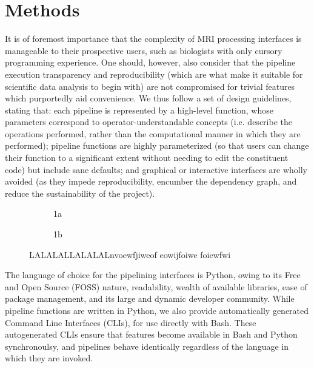 \section{Methods}
It is of foremost importance that the complexity of MRI processing interfaces is manageable to their prospective users, such as biologists with only cursory programming experience.
One should, however, also consider that the pipeline execution transparency and reproducibility (which are what make it suitable for scientific data analysis to begin with) are not compromised for trivial features which purportedly aid convenience. 
We thus follow  a set of design guidelines, stating that:
each pipeline is represented by a high-level function, whose parameters correspond to operator-understandable concepts (i.e. describe the operations performed, rather than the computational manner in which they are performed); 
pipeline functions are highly parameterized (so that users can change their function to a significant extent without needing to edit the constituent code) but include sane defaults;
and graphical or interactive interfaces are wholly avoided (as they impede reproducibility, encumber the dependency graph, and reduce the sustainability of the project).

\begin{figure*}[h]
	\begin{subfigure}{.67\textwidth}
		\centering
		\vspace{.55em}
		\caption{1a}
		\label{fig:sfig1}
	\end{subfigure}%
	\begin{subfigure}{.33\textwidth}
		\centering
		\caption{1b}
		\label{fig:sfig2}
	\end{subfigure}
	\caption{LALALALLALALALnvoewfjiweof eowijfoiwe foiewfwi}
	\label{fig:wfs}
\end{figure*}

The language of choice for the pipelining interfaces is Python, owing to its Free and Open Source (FOSS) nature, readability, wealth of available libraries, ease of package management, and its large and dynamic developer community.
While pipeline functions are written in Python, we also provide automatically generated Command Line Interfaces (CLIs), for use directly with Bash.
These autogenerated CLIs ensure that features become available in Bash and Python synchronoulsy, and pipelines behave identically regardless of the language in which they are invoked.

